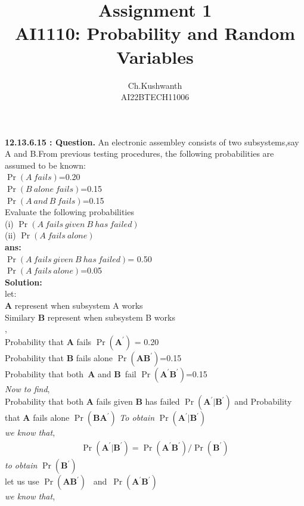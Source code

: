 \documentclass[journal,12pt,twocolumn]{IEEEtran}
\title{\textbf{Assignment 1}
\\ \textbf{AI1110:} Probability and Random Variables}
\author{Ch.Kushwanth
\\ AI22BTECH11006}
\providecommand{\pr}[1]{\ensuremath{\Pr\left(#1\right)}}
\theoremstyle{remark}
\begin{document}
\maketitle
\textbf{12.13.6.15 : Question.}
An electronic assembley consists of two subsystems,say A and B.From previous testing procedures, the following probabilities are assumed to be known:
 \\\pr{A\  fails}=0.20
\\\pr{B \ alone\  fails}=0.15
 \\ \pr{A \ and \ B \ fails}=0.15
\\ Evaluate the following probabilities
\\ (i) \pr{A\ fails\  given\ B\ has\ failed}
\\ (ii) \pr{A\ fails\ alone}
\\ \textbf{ans:}
\\ \pr{A\ fails\ given\ B\ has\ failed}= 0.50 
\\ \pr{A\ fails\ alone}=0.05
\\ \textbf{Solution:}
\\ let:
\\ \textbf{A} represent when subsystem A works
\\Similary \textbf{B} represent when subsystem B works
\\ ,
\\Probability that \textbf{A} fails  \pr{\textbf{A}^\prime} = 0.20
\\Probability that \textbf{B} fails alone \pr{\textbf{A}\textbf{B}^ \prime}=0.15
\\Probability that both\ \textbf{A} and \textbf{B}\ fail \pr{\textbf{A} ^\prime\textbf{B} ^\prime}=0.15
\\\textsl{Now to find},
\\Probability that both \textbf{A} fails given \textbf{B} has failed \pr{\textbf{A} ^\prime|\textbf{B} ^\prime} and \mbox{Probability} that \textbf{A} fails alone \pr{\textbf{B}\textbf{A}^\prime}
\textsl{To obtain }\pr{\textbf{A} ^\prime|\textbf{B} ^\prime}
\\ \textsl{we know that},
\begin{align}
 \pr{\textbf{A} ^\prime|\textbf{B} ^\prime}=\pr{ \textbf{A} ^\prime\textbf{B} ^\prime } /\pr{\textbf{B}^\prime}
\end{align}
 \textsl{to obtain} \pr{\textbf{B} ^\prime} 
\\let us use \pr{\textbf{A}  \textbf{B} ^\prime} \ and\  \pr{\textbf{A} ^\prime \textbf{B}^\prime}
\\ \textit{we know that},
\end{document}
